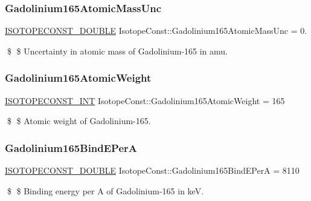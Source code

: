 \subsubsection{\texorpdfstring{Gadolinium165\+Atomic\+Mass\+Unc}{Gadolinium165AtomicMassUnc}}
{\footnotesize\ttfamily \mbox{\hyperlink{group___isotope_const-_macros_ga8f45a7272ce02c0b4c65c44636ed719a}{I\+S\+O\+T\+O\+P\+E\+C\+O\+N\+S\+T\+\_\+\+D\+O\+U\+B\+LE}} Isotope\+Const\+::\+Gadolinium165\+Atomic\+Mass\+Unc = 0.}

\$ \$ Uncertainty in atomic mass of Gadolinium-\/165 in amu. \mbox{\label{group___isotope_const-_gadolinium-_gd165_gacf41316159680ad2eee49ab340197c16}} 
\subsubsection{\texorpdfstring{Gadolinium165\+Atomic\+Weight}{Gadolinium165AtomicWeight}}
{\footnotesize\ttfamily \mbox{\hyperlink{group___isotope_const-_macros_ga5f18360b3e99483a35c32d789e62621c}{I\+S\+O\+T\+O\+P\+E\+C\+O\+N\+S\+T\+\_\+\+I\+NT}} Isotope\+Const\+::\+Gadolinium165\+Atomic\+Weight = 165}

\$ \$ Atomic weight of Gadolinium-\/165. \mbox{\label{group___isotope_const-_gadolinium-_gd165_ga2e3afb69500eced4826d7925ac15037e}} 
\subsubsection{\texorpdfstring{Gadolinium165\+Bind\+E\+PerA}{Gadolinium165BindEPerA}}
{\footnotesize\ttfamily \mbox{\hyperlink{group___isotope_const-_macros_ga8f45a7272ce02c0b4c65c44636ed719a}{I\+S\+O\+T\+O\+P\+E\+C\+O\+N\+S\+T\+\_\+\+D\+O\+U\+B\+LE}} Isotope\+Const\+::\+Gadolinium165\+Bind\+E\+PerA = 8110}

\$ \$ Binding energy per A of Gadolinium-\/165 in keV. \mbox{\label{group___isotope_const-_gadolinium-_gd165_gaddf7b4d936616519bc71796e1cb4a0fd}} 
